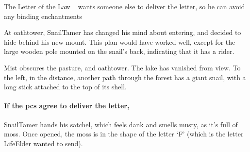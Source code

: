 {The Letter of the Law}%
{~ wants someone else to deliver the letter, so he can avoid any binding enchantments}%

At \gls{oathtower}, \gls{SnailTamer} has changed his mind about entering, and decided to hide behind his new mount.
This plan would have worked well, except for the large wooden pole mounted on the snail's back, indicating that it has a rider.

\begin{boxtext}
  Mist obscures the pasture, and \gls{oathtower}.
  The lake has vanished from view.
  To the left, in the distance, another path through the forest has a giant snail, with a long stick attached to the top of its shell.
\end{boxtext}

\paragraph{If the \glspl{pc} agree to deliver the letter,}
\gls{SnailTamer} hands his satchel, which feels dank and smells musty, as it's full of moss.
Once opened, the moss is in the shape of the letter `F' (which is the letter \gls{LifeElder} wanted to send).


